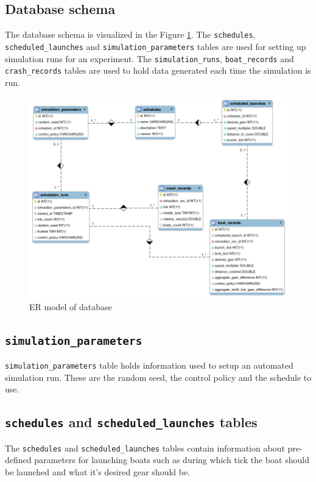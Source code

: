 \subsection{Database schema}\label{software:experiment:db}

The database schema is visualized in the Figure
\ref{software:fig:eer}. The \texttt{schedules}, \texttt{scheduled\_launches} and
\texttt{simulation\_parameters} tables are used for setting up simulation runs for an
experiment. The \texttt{simulation\_runs}, \texttt{boat\_records} and
\texttt{crash\_records} tables are used to hold data generated each
time the simulation is run.

\begin{figure}
\begin{center}
  \includegraphics[scale=0.3]{images/eer.png}
  \caption{ER model of database}
  \label{software:fig:eer}
\end{center}
\end{figure}

\subsection{\texttt{simulation\_parameters}}
\texttt{simulation\_parameters} table holds information used to setup
an automated simulation run. These are the random seed, the control
policy and the schedule to use.

\subsection{\texttt{schedules} and \texttt{scheduled\_launches}
  tables}
The \texttt{schedules} and \texttt{scheduled\_launches} tables contain
information about pre-defined parameters for launching boats such as
during which tick the boat should be launched and what it's desired
gear should be.


